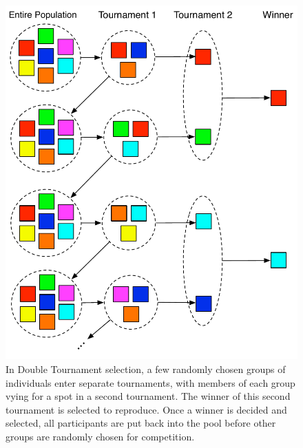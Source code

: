 \documentclass[12pt]{report} 	%
\numberwithin{figure}{chapter}
\numberwithin{table}{chapter}
\numberwithin{equation}{chapter}
\begin{document}
\begin{flushleft}
\begin{description}
\begin{figure}[h!]
\begin{center}
\includegraphics[scale = 0.7]{DoubleTournamentSelection}
\caption[Double tournament selection]{In Double Tournament selection, a few randomly chosen groups of individuals enter separate tournaments, with members of each group vying for a spot in a second tournament. The winner of this second tournament is selected to reproduce. Once a winner is decided and selected, all participants are put back into the pool before other groups are randomly chosen for competition.}
\end{center}
\end{figure}
\\
\item 
\end{description}


\end{flushleft}
\end{document}

